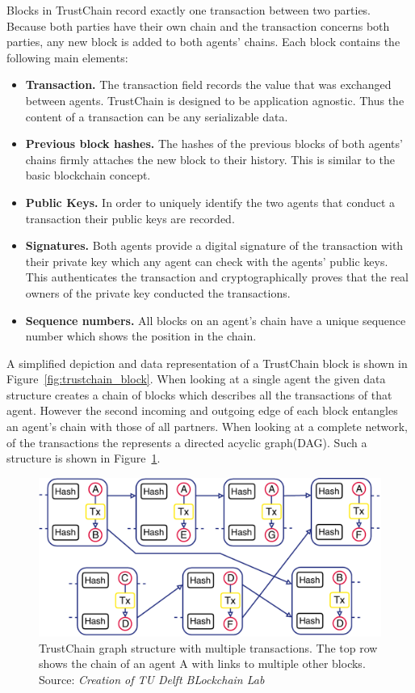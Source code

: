 Blocks in TrustChain record exactly one transaction between two parties. Because both parties have 
their own chain and the transaction concerns both parties, any new block is added to both agents'
chains. Each block contains the following main elements:

\begin{itemize}
    \item \textbf{Transaction.} The transaction field records the value that was exchanged between agents.
    TrustChain is designed to be application agnostic. Thus the content of a transaction can be any 
    serializable data. 
    \item \textbf{Previous block hashes.} The hashes of the previous blocks of both agents' chains 
    firmly attaches the new block to their history. This is similar to the basic blockchain concept.
    \item \textbf{Public Keys.} In order to uniquely identify the two agents that conduct a transaction
    their public keys are recorded.
    \item \textbf{Signatures.} Both agents provide a digital signature of the transaction with their 
    private key which any agent can check with the agents' public keys. This authenticates the 
    transaction and cryptographically proves that the real owners of the private key conducted the 
    transactions.
    \item \textbf{Sequence numbers.} All blocks on an agent's chain have a unique sequence number 
    which shows the position in the chain. 
\end{itemize}

A simplified depiction and data representation of a TrustChain block is shown in Figure~\ref{fig:trustchain_block}. When 
looking at a single agent the given data structure creates a chain of blocks which describes all the
transactions of that agent. However the second incoming and outgoing edge of each block entangles an
agent's chain with those of all partners. When looking at a complete network, of the transactions the
represents a directed acyclic graph(DAG). Such a structure is shown in Figure~\ref{fig:trustchain_graph}.

\begin{figure}
    \centering
    \includegraphics[width=\textwidth]{images/trustchain_graph.pdf}
    \caption{TrustChain graph structure with multiple transactions. The top row shows the chain of
    an agent A with links to multiple other blocks. Source: \textit{Creation of TU Delft BLockchain Lab}}
    \label{fig:trustchain_graph}
\end{figure}

